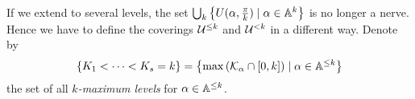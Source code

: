 \begin{rem}
\begin{comment}
        \draw[->,red!40!black] ({cos( 45 )},{sin( 45 )})
          to [out=35, in=25] (rgt);

        \draw[->,red!40!black] ({cos( 55 )},{sin( 55 )})
          to [out=65, in=75] (lft);

        \draw[thick,red!40!black,path fading=west] (0,0) -- +({cos( 85 )},{sin( 85 )});
        \draw[thick,red!40!black,path fading=west] (0,0) -- +({cos( 15 )},{sin( 15 )});
        \fill[red!40!black] ({cos( 85 )},{sin( 85 )}) circle (1pt);
        \fill[red!40!black] ({cos( 15 )},{sin( 15 )}) circle (1pt);

        \foreach \w/\str in {10/,
                             20/,
                             45/$\alpha_i$,
                             55/$\alpha_{i+1}$}
        {\draw (0,0) -- +({cos( \w )},{sin( \w )}) node[right] {\str};
         \fill[blue!20!white] ({cos( \w )},{sin( \w )}) circle (.7pt);
         \foreach \sep in {60,120,180,240,300}
         {\draw (0,0) -- +({cos( \w + \sep )},{sin( \w + \sep )});
          \fill[blue!20!white]
            ({cos( \w + \sep )},{sin( \w + \sep )}) circle (.7pt);
         }
        };


        \fill (zero) circle (1pt);
      \end{tikzpicture}
    \end{center}
  \end{comment}
\end{rem}
If we extend to several levels, the set
$\bigcup_k\left\{U(\alpha,\frac{\pi}{k})\mid\alpha\in\mathbb{A}^{k}\right\}$ is no
longer a nerve.
Hence we have to define the coverings $\mathcal{U}^{\leq k}$ and $\mathcal{U}^{<k}$ in a
different way.
Denote by
\[
  \left\{K_1<\cdots<K_s=k\right\}
  =\left\{\max\left(\mathcal{K}_\alpha\cap[0,k]\right)\mid\alpha\in\mathbb{A}^{\leq k}\right\}
\]
the set of all \emph{$k$-maximum levels} for $\alpha\in\mathbb{A}^{\leq k}$.
